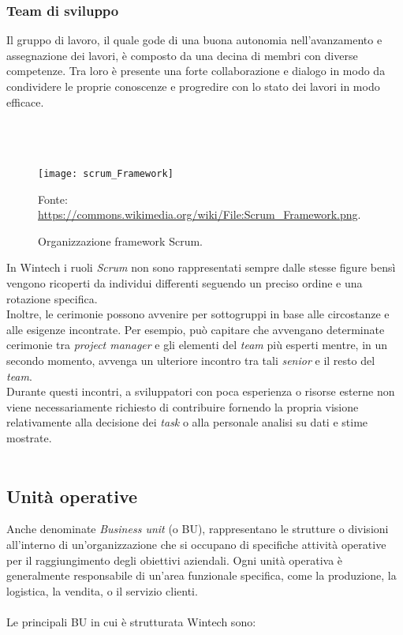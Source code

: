 \subsubsection*{Team di sviluppo}
Il gruppo di lavoro, il quale gode di una buona autonomia nell'avanzamento e assegnazione dei lavori, è composto da una decina di membri con diverse competenze. Tra loro è presente una forte collaborazione e dialogo in modo da condividere le proprie conoscenze e progredire con lo stato dei lavori in modo efficace.\\\\\\\\
\begin{figure}[htbp] 
    \centering 
    \texttt{[image: scrum\_Framework]} 
    \caption{Organizzazione framework Scrum.}
    \label{fig:scrum_framework}
    \vspace{1mm}
    Fonte: \url{https://commons.wikimedia.org/wiki/File:Scrum_Framework.png}.
\end{figure}
\newpage \noindent In Wintech i ruoli \emph{Scrum} non sono rappresentati sempre dalle stesse figure bensì vengono ricoperti da individui differenti seguendo un preciso ordine e una rotazione specifica.\\
Inoltre, le cerimonie possono avvenire per sottogruppi in base alle circostanze e alle esigenze incontrate. Per esempio, può capitare che avvengano determinate cerimonie tra \emph{project manager} e gli elementi del \emph{team} più esperti mentre, in un secondo momento, avvenga un ulteriore incontro tra tali \emph{senior} e il resto del \emph{team}.\\
Durante questi incontri, a sviluppatori con poca esperienza o risorse esterne non viene necessariamente richiesto di contribuire fornendo la propria visione relativamente alla decisione dei \emph{task} o alla personale analisi su dati e stime mostrate.\\\\

\subsection{Unità operative}
Anche denominate \emph{Business unit} (o BU), rappresentano le strutture o divisioni all'interno di un'organizzazione che si occupano di specifiche attività operative per il raggiungimento degli obiettivi aziendali. Ogni unità operativa è generalmente responsabile di un'area funzionale specifica, come la produzione, la logistica, la vendita, o il servizio clienti.\\\\
Le principali BU in cui è strutturata Wintech sono:

